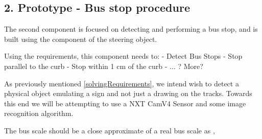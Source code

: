 \subsection{2. Prototype - Bus stop procedure}
The second component is focused on detecting and performing a bus stop, and is built using the component of the steering object. 

Using the requirements, this component needs to:
    - Detect Bus Stops
    - Stop parallel to the curb
    - Stop within 1 cm of the curb
    - ... ? More?
\todo{}

As previously mentioned \ref{solvingRequirements}, we intend wish to detect a physical object emulating a sign and not just a drawing on the tracks. Towards this end we will be attempting to use a NXT CamV4 Sensor and some image recognition algorithm. 


The bus scale should be a close approximate of a real bus scale as \cite{DriveingCurves}, 